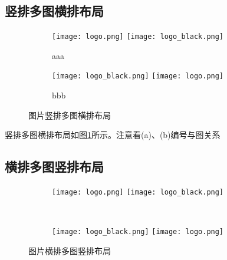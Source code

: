 \subsection{竖排多图横排布局}

\begin{figure}[!htb]
    \centering
    \begin{subfigure}[t]{0.13\linewidth}
        \captionsetup{justification=centering} 
        \begin{minipage}[b]{1\linewidth}
        \texttt{[image: logo.png]} 
        \vspace{-1ex} \vfill
        \texttt{[image: logo\_black.png]}
        \caption{aaa}
        \end{minipage}
    \end{subfigure}
    \begin{subfigure}[t]{0.13\linewidth}
        \captionsetup{justification=centering} 
        \begin{minipage}[b]{1\linewidth}
        \texttt{[image: logo\_black.png]} 
        \vspace{-1ex} \vfill
        \texttt{[image: logo.png]}
        \caption{bbb}
        \end{minipage}
    \end{subfigure}
    \caption{图片竖排多图横排布局}
    \label{f.suep_col_row}
\end{figure}

竖排多图横排布局如图\ref{f.suep_col_row}所示。注意看(a)、(b)编号与图关系


\subsection{横排多图竖排布局}

\begin{figure}[!htb]
    \centering
    \begin{subfigure}[t]{0.3\linewidth}
        \captionsetup{justification=centering} 
        \begin{minipage}[b]{1\linewidth}
        \texttt{[image: logo.png]}
        \texttt{[image: logo\_black.png]}
        \caption{}
        \end{minipage}
    \end{subfigure}\\
    \begin{subfigure}[t]{0.3\linewidth}
        \captionsetup{justification=centering} 
        \begin{minipage}[b]{1\linewidth}
        \texttt{[image: logo\_black.png]}
        \texttt{[image: logo.png]}
        \caption{}
        \end{minipage}
    \end{subfigure}
    \caption{图片横排多图竖排布局}
    \label{f.suep_row_col}
\end{figure}

